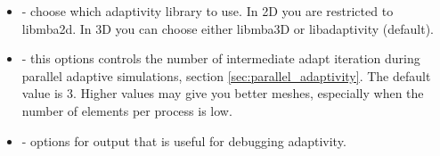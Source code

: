 \begin{itemize}
is adapted, then the mesh is extruded using the adaptivity metric in the 3rd dimension. You must use an extruded mesh with this option, section \ref{sec:extruded_meshes}.
\item {} - choose which adaptivity library to use. In 2D you are restricted to libmba2d. In 3D you can choose either libmba3D or libadaptivity (default).
\item {} - this options controls the number of intermediate adapt iteration during parallel adaptive simulations, section \ref{sec:parallel_adaptivity}. The default value is 3. Higher values may give you
better meshes, especially when the number of elements per process is low.
\item {} - options for output that is useful for debugging adaptivity.
\end{itemize}

